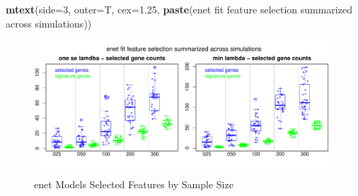 \documentclass[
]{book}
\newenvironment{Shaded}{\begin{snugshade}}{\end{snugshade}}
\newcommand{\DataTypeTok}[1]{\textcolor[rgb]{0.13,0.29,0.53}{#1}}
\newcommand{\DecValTok}[1]{\textcolor[rgb]{0.00,0.00,0.81}{#1}}
\newcommand{\FloatTok}[1]{\textcolor[rgb]{0.00,0.00,0.81}{#1}}
\newcommand{\KeywordTok}[1]{\textcolor[rgb]{0.13,0.29,0.53}{\textbf{#1}}}
\newcommand{\NormalTok}[1]{#1}
\newcommand{\StringTok}[1]{\textcolor[rgb]{0.31,0.60,0.02}{#1}}
\begin{document}
\begin{Shaded}
\begin{Highlighting}[]
\KeywordTok{mtext}\NormalTok{(}\DataTypeTok{side=}\DecValTok{3}\NormalTok{, }\DataTypeTok{outer=}\NormalTok{T, }\DataTypeTok{cex=}\FloatTok{1.25}\NormalTok{, }\KeywordTok{paste}\NormalTok{(}\StringTok{\textquotesingle{}enet fit feature selection summarized across simulations\textquotesingle{}}\NormalTok{))}
\end{Highlighting}
\end{Shaded}

\begin{figure}
\centering
\includegraphics{Static/figures/hcc5hmC-glmnetSuiteB-enet-simRes-features-OverSim-1.pdf}
\caption{\label{fig:hcc5hmC-glmnetSuiteB-enet-simRes-features-OverSim}enet Models Selected Features by Sample Size}
\end{figure}
\end{document}
